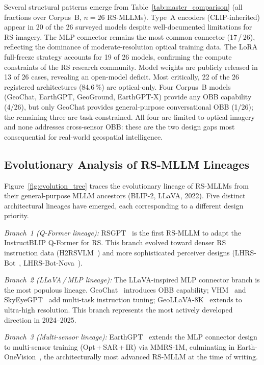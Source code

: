 Several structural patterns emerge from Table~\ref{tab:master_comparison}
(all fractions over Corpus~B, $n=26$ RS-MLLMs).
Type~A encoders (CLIP-inherited) appear in 20 of the 26 surveyed models despite well-documented
limitations for RS imagery. The MLP connector remains the most common connector (17\,/\,26),
reflecting the dominance of moderate-resolution optical training data. The LoRA
full-freeze strategy accounts for 19 of 26 models, confirming the compute constraints
of the RS research community. Model weights are publicly released in 13 of 26 cases, revealing
an open-model deficit. Most critically, 22 of the 26 registered architectures (84.6\,\%) are optical-only.
Four Corpus~B models (GeoChat, EarthGPT, GeoGround, EarthGPT-X) provide any OBB capability (4/26), but only GeoChat provides general-purpose conversational OBB (1/26); the remaining three are task-constrained. All four are limited to optical imagery and none addresses cross-sensor OBB: these are the two design gaps most consequential for real-world geospatial intelligence.

\subsection{Evolutionary Analysis of RS-MLLM Lineages}\label{sec3:evolution}

Figure~\ref{fig:evolution_tree} traces the evolutionary lineage of RS-MLLMs from their
general-purpose MLLM ancestors (BLIP-2, LLaVA, 2022). Five distinct architectural
lineages have emerged, each corresponding to a different design priority.

\textit{Branch~1 (Q-Former lineage):} RSGPT~\cite{rsgpt2023} is the first RS-MLLM to
adapt the InstructBLIP Q-Former for RS. This branch evolved toward denser RS instruction
data (H2RSVLM~\cite{h2rsvlm2025}) and more sophisticated perceiver designs
(LHRS-Bot~\cite{lhrsbot2024}, LHRS-Bot-Nova~\cite{lhrsbotnova2024}).

\textit{Branch~2 (LLaVA\,/\,MLP lineage):} The LLaVA-inspired MLP connector branch is
the most populous lineage. GeoChat~\cite{geochat2024} introduces OBB capability;
VHM~\cite{vhm2025} and SkyEyeGPT~\cite{skyeyegpt2025} add multi-task instruction
tuning; GeoLLaVA-8K~\cite{geollava2025} extends to ultra-high resolution. This branch
represents the most actively developed direction in 2024--2025.

\textit{Branch~3 (Multi-sensor lineage):} EarthGPT~\cite{earthgpt2025} extends the MLP
connector design to multi-sensor training (Opt\,+\,SAR\,+\,IR) via MMRS-1M, culminating
in Earth-OneVision~\cite{earthonevision2026}, the architecturally most advanced
RS-MLLM at the time of writing.

